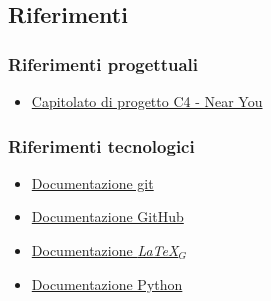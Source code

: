     \subsection{Riferimenti}
        \subsubsection{Riferimenti progettuali}
        \begin{itemize}
            \item \href{https://www.math.unipd.it/~tullio/IS-1/2024/Progetto/C4.pdf}{Capitolato di progetto C4 - Near You}
        \end{itemize}
        \subsubsection{Riferimenti tecnologici}
        \begin{itemize}
            \item \href{https://git-scm.com/docs}{Documentazione git}
            \item \href{https://docs.github.com/en}{Documentazione GitHub}
            \item \href{https://www.latex-project.org/help/documentation/}{Documentazione \textit{LaTeX}$_G$}
            \item \href{https://www.python.org/doc/}{Documentazione Python}
        \end{itemize}